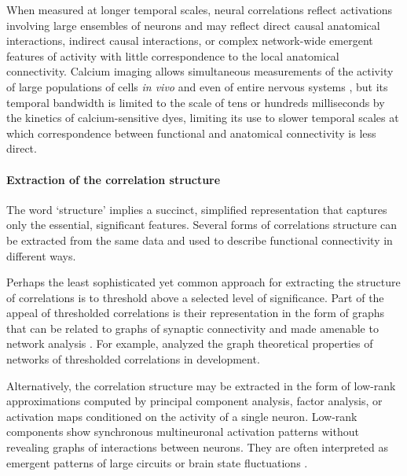 \documentclass[10pt]{article}
\begin{document}
When measured at longer temporal scales, neural correlations reflect activations involving large ensembles of neurons and may reflect direct causal anatomical interactions, indirect causal interactions, or complex network-wide emergent features of activity with little correspondence to the local anatomical connectivity. Calcium imaging allows simultaneous measurements of the activity of large populations of cells \emph{in vivo} \cite{Katona:2012, Cotton:2013} and even of entire nervous systems \cite{Leung:2013, Ahrens:2013}, but its temporal bandwidth is limited to the scale of tens or hundreds milliseconds by the kinetics of calcium-sensitive dyes, limiting its use to slower temporal scales at which correspondence between functional and anatomical connectivity is less direct.

\paragraph{Extraction of the correlation structure}
The word `structure' implies a succinct, simplified representation that captures only the essential, significant features. Several forms of correlations structure can be extracted from the same data and used to describe functional connectivity in different ways.

Perhaps the least sophisticated yet common approach for extracting the structure of correlations is to threshold above a selected level of significance. Part of the appeal of thresholded correlations is their representation in the form of graphs that can be related to graphs of synaptic connectivity and made amenable to network analysis \cite{Bullmore:2012}. For example, \cite{Malmersjo:2013} analyzed the graph theoretical properties of networks of thresholded correlations in development. 

Alternatively, the correlation structure may be extracted in the form of low-rank approximations computed by principal component analysis, factor analysis, or activation maps conditioned on the activity of a single neuron. Low-rank components show synchronous multineuronal activation patterns without revealing graphs of interactions between neurons. They are often interpreted as emergent patterns of large circuits or brain state fluctuations \cite{Kenet:2003}.
\end{document}
